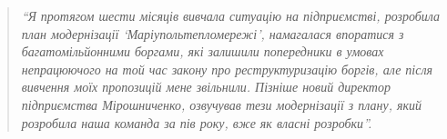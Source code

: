  
 
 
 
 

\begin{quote}
\em\enquote{Я протягом шести місяців вивчала ситуацію на підприємстві,  розробила план
модернізації \enquote{Маріупольтепломережі}, намагалася впоратися з багатомільйонними
боргами, які залишили попередники в умовах непрацюючого на той час закону про
реструктуризацію боргів, але після вивчення моїх пропозицій мене звільнили.
Пізніше новий директор підприємства Мірошниченко, озвучував тези модернізації з
плану, який розробила наша команда за пів року, вже як власні розробки}. 
\end{quote}

